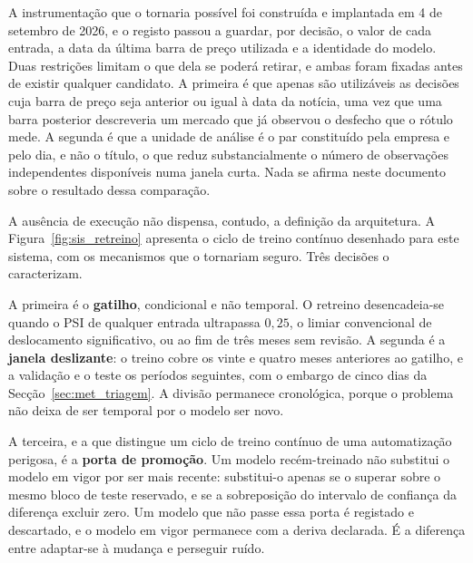A instrumentação que o tornaria possível foi construída e implantada em 4 de setembro de 2026, e
o registo passou a guardar, por decisão, o valor de cada entrada, a data da última barra de preço
utilizada e a identidade do modelo. Duas restrições limitam o que dela se poderá retirar, e ambas
foram fixadas antes de existir qualquer candidato. A primeira é que apenas são utilizáveis as
decisões cuja barra de preço seja anterior ou igual à data da notícia, uma vez que uma barra
posterior descreveria um mercado que já observou o desfecho que o rótulo mede. A segunda é que a
unidade de análise é o par constituído pela empresa e pelo dia, e não o título, o que reduz
substancialmente o número de observações independentes disponíveis numa janela curta. Nada se
afirma neste documento sobre o resultado dessa comparação.

A ausência de execução não dispensa, contudo, a definição da arquitetura. A
Figura~\ref{fig:sis_retreino} apresenta o ciclo de treino contínuo desenhado para este sistema, com
os mecanismos que o tornariam seguro. Três decisões o caracterizam.

A primeira é o \textbf{gatilho}, condicional e não temporal. O retreino desencadeia-se quando o
\gls{PSI} de qualquer entrada ultrapassa $0{,}25$, o limiar convencional
de deslocamento significativo, ou ao fim de três meses sem revisão. A segunda é a \textbf{janela
deslizante}: o treino cobre os vinte e quatro meses anteriores ao gatilho, e a validação e o teste
os períodos seguintes, com o embargo de cinco dias da Secção~\ref{sec:met_triagem}. A divisão
permanece cronológica, porque o problema não deixa de ser temporal por o modelo ser novo.

A terceira, e a que distingue um ciclo de treino contínuo de uma automatização perigosa, é a
\textbf{porta de promoção}. Um modelo recém-treinado não substitui o modelo em vigor por ser mais
recente: substitui-o apenas se o superar sobre o mesmo bloco de teste reservado, e se a
sobreposição do intervalo de confiança da diferença excluir zero. Um modelo que não passe essa
porta é registado e descartado, e o modelo em vigor permanece com a deriva declarada. É a diferença
entre adaptar-se à mudança e perseguir ruído.

